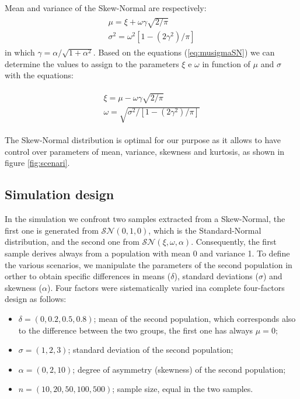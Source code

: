 \documentclass[twocolumn]{article}\usepackage[]{graphicx}\usepackage[]{xcolor}
\begin{document}
Mean and variance of the Skew-Normal are respectively: 
\begin{eqnarray}\label{eq:musigmaSN}
\begin{array}{l}
\mu = \xi + \omega \gamma \sqrt{2/\pi} \\
\sigma^2 = \omega^2 [1- (2\gamma^2)/\pi]
\end{array}
\end{eqnarray}
in which $\gamma = \alpha / \sqrt{1 + \alpha^2}$. Based on the equations (\ref{eq:musigmaSN}) we can determine the values to assign to the parameters $\xi$ e $\omega$ in function of $\mu$ and $\sigma$ with the equations:

\begin{eqnarray}\label{eq:xiomegaSN}
\begin{array}{l}
 \xi = \mu - \omega \gamma \sqrt{2/\pi} \\
 \omega = \sqrt{\sigma^2/ [1- (2\gamma^2)/\pi]}
\end{array}
\end{eqnarray}

The Skew-Normal distribution is optimal for our purpose as it allows to have control over parameters of mean, variance, skewness and kurtosis, as shown in figure \ref{fig:scenari}.

\subsection{Simulation design}




In the simulation we confront two samples extracted from a Skew-Normal, the first one is generated from $\mathcal{SN}(0,1,0)$, which is the Standard-Normal distribution, and the second one from $\mathcal{SN}(\xi,\omega,\alpha)$. Consequently, the first sample derives always from a population with mean 0 and variance 1. To define the various scenarios, we manipulate the parameters of the second population in orther to obtain specific differences in means ($\delta$), standard deviations ($\sigma$) and skewness ($\alpha$). Four factors were sistematically varied ina complete four-factors design as follows:

\begin{itemize}

   \item $\delta = (0, 0.2, 0.5, 0.8)$; mean of the second population, which corresponds also to the difference between the two groups, the first one has always $\mu = 0$;
  \item $\sigma = (1, 2, 3)$; standard deviation of the second population;
  \item $\alpha = (0, 2, 10)$; degree of asymmetry (skewness) of the second population; 
  \item $n = (10, 20, 50, 100, 500)$; sample size, equal in the two samples.
 

\end{itemize}
\end{document}
